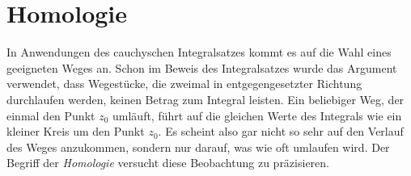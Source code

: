 %
%
%
\section{Homologie
\label{buch:integration:section:homologie}}
%
In Anwendungen des cauchyschen Integralsatzes kommt es auf die Wahl
eines geeigneten Weges an.
Schon im Beweis des Integralsatzes wurde das Argument verwendet, dass
Wegestücke, die zweimal in entgegengesetzter Richtung durchlaufen
werden, keinen Betrag zum Integral leisten.
Ein beliebiger Weg, der einmal den Punkt $z_0$ umläuft, führt auf die
gleichen Werte des Integrals wie ein kleiner Kreis um den Punkt $z_0$.
Es scheint also gar nicht so sehr auf den Verlauf des Weges anzukommen,
sondern nur darauf, was wie oft umlaufen wird.
Der Begriff der \emph{Homologie} versucht diese Beobachtung
zu präzisieren.







